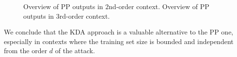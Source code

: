\begin{figure}[t]
\caption[Overview of Projection Pursuit outputs in $2$nd-order and $3$rd-order context.]{ Overview of PP outputs in $2$nd-order context.  Overview of PP outputs in $3$rd-order context. }
\end{figure}

We conclude that the KDA approach is a valuable alternative to the PP one, especially in contexts where the training set size is bounded and independent from the order $d$ of the attack.


